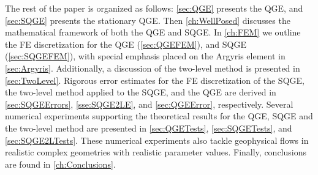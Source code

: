 The rest of the paper is organized as follows: \autoref{sec:QGE} presents the
QGE, and \autoref{sec:SQGE} presents the stationary QGE. Then
\autoref{ch:WellPosed} discusses the mathematical framework of both the QGE
and SQGE.  In \autoref{ch:FEM} we outline the FE discretization for the QGE
(\autoref{sec:QGEFEM}), and SQGE (\autoref{sec:SQGEFEM}), with special emphasis
placed on the Argyris element in \autoref{sec:Argyris}. Additionally, a discussion
of the two-level method is presented in \autoref{sec:TwoLevel}. Rigorous error
estimates for the FE discretization of the SQGE, the two-level method applied
to the SQGE, and the QGE are derived in \autoref{sec:SQGEErrors},
\autoref{sse:SQGE2LE}, and \autoref{sec:QGEError}, respectively.  Several
numerical experiments supporting the theoretical results for the QGE, SQGE and
the two-level method are presented in \autoref{sec:QGETests},
\autoref{sec:SQGETests}, and \autoref{sec:SQGE2LTests}. These numerical
experiments also tackle geophysical flows in realistic complex geometries with
realistic parameter values. Finally, conclusions are found in
\autoref{ch:Conclusions}.

